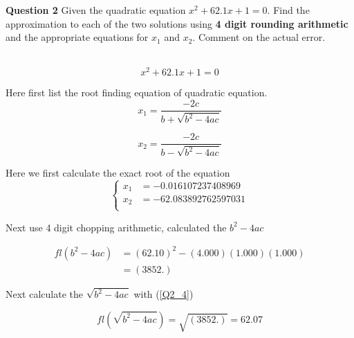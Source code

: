

\begin{tcolorbox}
\textbf{Question 2} Given the quadratic equation $x^{2}+62.1 x+1=0$. Find the approximation to each of the two solutions using \textbf{4 digit rounding arithmetic} and the appropriate equations for $x_{1}$ and $x_{2}$. Comment on the actual error.
\end{tcolorbox}

\begin{solution}\ \\




\begin{equation}
	x^{2}+62.1 x+1=0 \label{question_1_origin}
\end{equation}





Here first list the root finding equation of quadratic equation.
\begin{equation}
x_{1}=\frac{-2 c}{b+\sqrt{b^{2}-4 a c}} \label{x1_root_finding_function}
\end{equation}

\begin{equation}
x_{2}=\frac{-2 c}{b-\sqrt{b^{2}-4 a c}} \label{x2_root_finding_function}
\end{equation}


Here we first calculate the exact root of the equation
\begin{equation}
\left\{
	\begin{aligned}
		x_1&=-0.016107237408969\\
		x_2&=-62.083892762597031 \label{exact_root} \\ 
	\end{aligned}
\right.
\end{equation}

Next use 4 digit chopping arithmetic, calculated the $b^2-4ac$

\begin{equation}
\begin{aligned}
f l\left(b^{2}-4 a c\right) &=(62.10)^{2}-(4.000)(1.000)(1.000) \\
&=(3852 .) \label{Q2_4}
\end{aligned}
\end{equation}



Next calculate the $\sqrt{b^2-4ac}$ with (\ref{Q2_4})

\begin{equation}
	fl(\sqrt{b^2-4ac})=\sqrt{(3852.)}=62.07 \label{Q2_3852}
\end{equation}


\end{solution}

